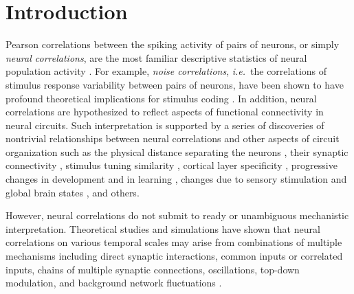 \documentclass[10pt]{article}
\begin{document}
\section*{Introduction}
Pearson correlations between the spiking activity of pairs of neurons, or simply \emph{neural correlations}, are the most familiar descriptive statistics of neural population activity \cite{Averbeck:2006,Zohary:1994,Kohn:2005,Bair:2001,Renart:2010}.  For example, \emph{noise correlations}, \emph{i.e.}~the correlations of stimulus response variability between pairs of neurons, have been shown to have profound theoretical implications for stimulus coding \cite{Zohary:1994,Abbott:1999,Averbeck:2006,Berens:2011,Ecker:2011}. In addition, neural correlations are hypothesized to reflect aspects of functional connectivity in neural circuits.  Such interpretation is supported by a series of discoveries of nontrivial relationships between neural correlations and other aspects of circuit organization such as the physical distance separating the neurons \cite{Smith:2008,Denman:2013}, their synaptic connectivity \cite{Ko:2011},  stimulus tuning similarity \cite{Kohn:2005,Ko:2011}, cortical layer specificity \cite{Hansen:2012,Smith:2013}, progressive changes in development and in learning \cite{Golshani:2009}, changes due to sensory stimulation and global brain states \cite{Goard:2009,Kohn:2009,Ecker:2010,Renart:2010}, and others.

However, neural correlations do not submit to ready or unambiguous mechanistic interpretation.  Theoretical studies and simulations have shown that neural correlations on various temporal scales may arise from combinations of multiple mechanisms including  direct synaptic interactions, common inputs or correlated inputs, chains of multiple synaptic connections, oscillations, top-down modulation, and background network fluctuations \cite{Perkel:1967b,Shadlen:1998,Salinas:2001,Ostojic:2009,Rosenbaum:2011}.
\end{document}
